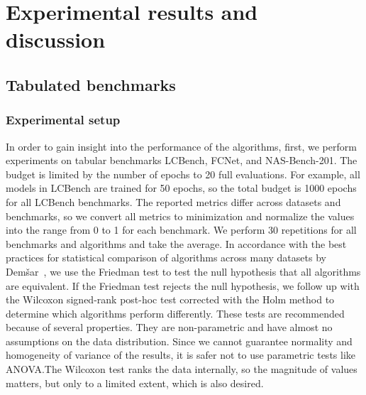 \chapter{Experimental results and discussion}

\section{Tabulated benchmarks}

\subsection{Experimental setup}

In order to gain insight into the performance of the algorithms, first, we perform experiments on tabular benchmarks LCBench, FCNet, and NAS-Bench-201. The budget is limited by the number of epochs to 20 full evaluations. For example, all models in LCBench are trained for 50 epochs, so the total budget is 1000 epochs for all LCBench benchmarks. The reported metrics differ across datasets and benchmarks, so we convert all metrics to minimization and normalize the values into the range from 0 to 1 for each benchmark. We perform 30 repetitions for all benchmarks and algorithms and take the average. In accordance with the best practices for statistical comparison of algorithms across many datasets by Demšar~\cite{demvsar2006statistical}, we use the Friedman test to test the null hypothesis that all algorithms are equivalent. If the Friedman test rejects the null hypothesis, we follow up with the Wilcoxon signed-rank post-hoc test corrected with the Holm method to determine which algorithms perform differently. These tests are recommended because of several properties. They are non-parametric and have almost no assumptions on the data distribution. Since we cannot guarantee normality and homogeneity of variance of the results, it is safer not to use parametric tests like ANOVA.\@ The Wilcoxon test ranks the data internally, so the magnitude of values matters, but only to a limited extent, which is also desired.

